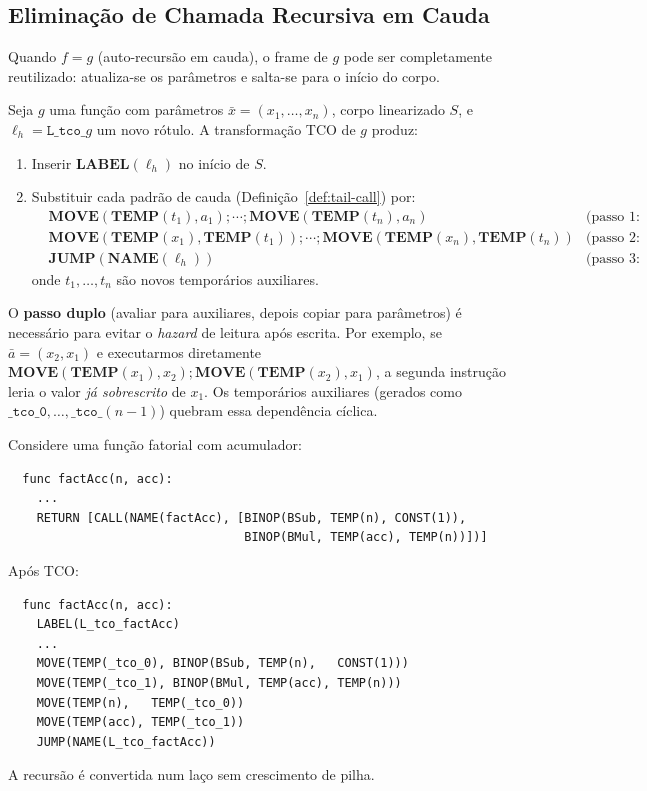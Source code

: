 \subsection{Eliminação de Chamada Recursiva em Cauda}

Quando $f = g$ (auto-recursão em cauda), o frame de $g$ pode ser completamente
reutilizado: atualiza-se os parâmetros e salta-se para o início do corpo.

\begin{Definition}\label{def:tco}
  Seja $g$ uma função com parâmetros $\bar{x} = (x_1, \ldots, x_n)$,
  corpo linearizado $S$, e $\ell_h = \mathtt{L\_tco\_}g$ um novo rótulo.
  A transformação TCO de $g$ produz:
  \begin{enumerate}
    \item Inserir $\mathbf{LABEL}(\ell_h)$ no início de $S$.
    \item Substituir cada padrão de cauda (Definição~\ref{def:tail-call}) por:
      \begin{align*}
        &\mathbf{MOVE}(\mathbf{TEMP}(t_1), a_1) \mathbin{;} \cdots \mathbin{;}
        \mathbf{MOVE}(\mathbf{TEMP}(t_n), a_n) & \text{(passo 1:
        avaliar argumentos)} \\
        &\mathbf{MOVE}(\mathbf{TEMP}(x_1), \mathbf{TEMP}(t_1))
        \mathbin{;} \cdots \mathbin{;}
        \mathbf{MOVE}(\mathbf{TEMP}(x_n), \mathbf{TEMP}(t_n)) &
        \text{(passo 2: atualizar parâmetros)} \\
        &\mathbf{JUMP}(\mathbf{NAME}(\ell_h)) & \text{(passo 3:
        reiniciar o laço)}
      \end{align*}
      onde $t_1, \ldots, t_n$ são novos temporários auxiliares.
  \end{enumerate}
\end{Definition}

O \textbf{passo duplo} (avaliar para auxiliares, depois copiar para parâmetros)
é necessário para evitar o \emph{hazard} de leitura após escrita.  Por exemplo,
se $\bar{a} = (x_2, x_1)$ e executarmos diretamente
$\mathbf{MOVE}(\mathbf{TEMP}(x_1), x_2) \mathbin{;}
\mathbf{MOVE}(\mathbf{TEMP}(x_2), x_1)$,
a segunda instrução leria o valor \emph{já sobrescrito} de $x_1$.  Os
temporários
auxiliares (gerados como $\mathtt{\_tco\_0}, \ldots, \mathtt{\_tco\_}(n{-}1)$)
quebram essa dependência cíclica.

\begin{example}
  Considere uma função fatorial com acumulador:
  \begin{verbatim}
  func factAcc(n, acc):
    ...
    RETURN [CALL(NAME(factAcc), [BINOP(BSub, TEMP(n), CONST(1)),
                                 BINOP(BMul, TEMP(acc), TEMP(n))])]
  \end{verbatim}
  Após TCO:
  \begin{verbatim}
  func factAcc(n, acc):
    LABEL(L_tco_factAcc)
    ...
    MOVE(TEMP(_tco_0), BINOP(BSub, TEMP(n),   CONST(1)))
    MOVE(TEMP(_tco_1), BINOP(BMul, TEMP(acc), TEMP(n)))
    MOVE(TEMP(n),   TEMP(_tco_0))
    MOVE(TEMP(acc), TEMP(_tco_1))
    JUMP(NAME(L_tco_factAcc))
  \end{verbatim}
  A recursão é convertida num laço sem crescimento de pilha.
\end{example}

